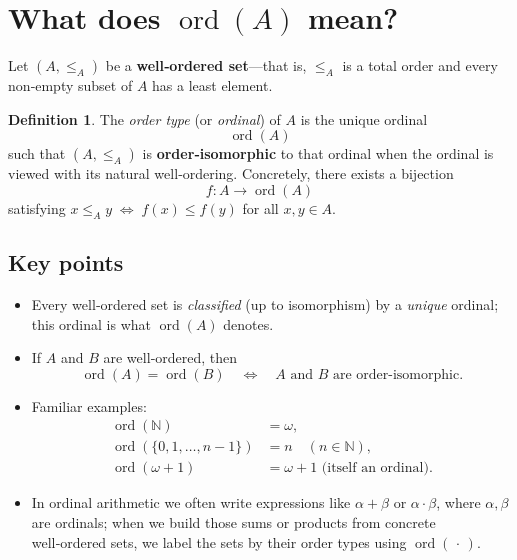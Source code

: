 \documentclass[12pt]{article}
\theoremstyle{definition} %
\newtheorem{definition}{Definition}
\theoremstyle{plain} %
\begin{document}
\section*{What does \texorpdfstring{$\operatorname{ord}(A)$}{ord(A)} mean?}

Let $(A,\le_A)$ be a \textbf{well‑ordered set}—that is, $\le_A$ is a total order and every non‑empty subset of $A$ has a least element.

\begin{definition}
The \emph{order type} (or \emph{ordinal}) of $A$ is the unique ordinal
\[
    \operatorname{ord}(A)
\]
such that $(A,\le_A)$ is \textbf{order‑isomorphic} to that ordinal when the ordinal is viewed with its natural well‑ordering.  Concretely, there exists a bijection
\[
    f:A \longrightarrow \operatorname{ord}(A)
\]
satisfying
\(
    x\le_A y \;\Longleftrightarrow\; f(x)\le f(y)
\)
for all $x,y\in A$.
\end{definition}

\subsection*{Key points}
\begin{itemize}
    \item Every well‑ordered set is \emph{classified} (up to isomorphism) by a \emph{unique} ordinal; this ordinal is what $\operatorname{ord}(A)$ denotes.
    \item If $A$ and $B$ are well‑ordered, then
          \[
              \operatorname{ord}(A)=\operatorname{ord}(B)
              \quad\Longleftrightarrow\quad
              A \text{ and } B \text{ are order‑isomorphic.}
          \]
    \item Familiar examples:
          \begin{align*}
              \operatorname{ord}(\mathbb N) &= \omega,\\
              \operatorname{ord}(\{0,1,\dots,n-1\}) &= n\quad (n\in\mathbb N),\\
              \operatorname{ord}(\omega\!+\!1) &= \omega+1 \text{ (itself an ordinal)}.
          \end{align*}
    \item In ordinal arithmetic we often write expressions like
          $\alpha+\beta$ or $\alpha\cdot\beta$, where $\alpha,\beta$ are
          ordinals; when we build those sums or products from concrete
          well‑ordered sets, we label the sets by their order types using
          $\operatorname{ord}(\,\cdot\,)$.
\end{itemize}
\end{document}
